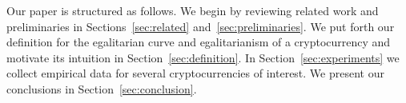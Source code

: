 Our paper is structured as follows. We begin by reviewing related work and preliminaries in
Sections~\ref{sec:related} and~\ref{sec:preliminaries}. We put forth our definition for the egalitarian curve
and egalitarianism of a cryptocurrency and motivate its intuition in
Section~\ref{sec:definition}. In Section~\ref{sec:experiments} we collect
empirical data for several cryptocurrencies of interest. We present our
conclusions in Section~\ref{sec:conclusion}.
